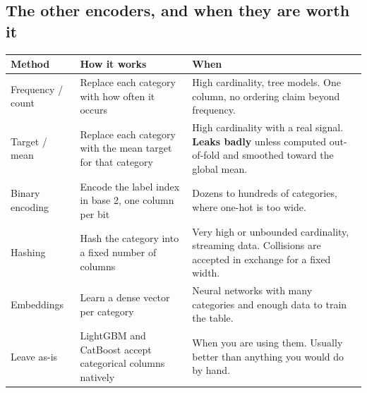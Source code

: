 \documentclass[11pt,a4paper]{article}
\begin{document}

\subsection{The other encoders, and when they are worth it}

\begin{tabularx}{\textwidth}{@{}l X X@{}}
\toprule
\rowcolor{tablehead} \textbf{Method} & \textbf{How it works} & \textbf{When} \\
\midrule
Frequency / count & Replace each category with how often it occurs & High cardinality, tree models. One column, no ordering claim beyond frequency. \\
Target / mean & Replace each category with the mean target for that category & High cardinality with a real signal. \textbf{Leaks badly} unless computed out-of-fold and smoothed toward the global mean. \\
Binary encoding & Encode the label index in base 2, one column per bit & Dozens to hundreds of categories, where one-hot is too wide. \\
Hashing & Hash the category into a fixed number of columns & Very high or unbounded cardinality, streaming data. Collisions are accepted in exchange for a fixed width. \\
Embeddings & Learn a dense vector per category & Neural networks with many categories and enough data to train the table. \\
Leave as-is & LightGBM and CatBoost accept categorical columns natively & When you are using them. Usually better than anything you would do by hand. \\
\bottomrule
\end{tabularx}

\end{document}
